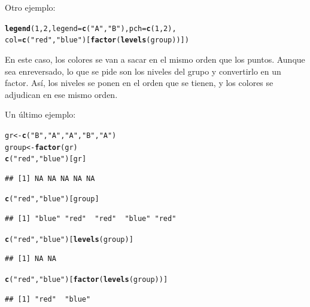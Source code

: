 \documentclass{config/apuntes}\usepackage[]{graphicx}\usepackage[]{xcolor}
\makeatletter
\newcommand{\hlnum}[1]{\textcolor[rgb]{0.686,0.059,0.569}{#1}}%
\newcommand{\hlsng}[1]{\textcolor[rgb]{0.192,0.494,0.8}{#1}}%
\newcommand{\hldef}[1]{\textcolor[rgb]{0.345,0.345,0.345}{#1}}%
\newcommand{\hlkwb}[1]{\textcolor[rgb]{0.69,0.353,0.396}{#1}}%
\newcommand{\hlkwc}[1]{\textcolor[rgb]{0.333,0.667,0.333}{#1}}%
\newcommand{\hlkwd}[1]{\textcolor[rgb]{0.737,0.353,0.396}{\textbf{#1}}}%
\newenvironment{kframe}{%
 \def\at@end@of@kframe{}%
 \ifinner\ifhmode%
  \def\at@end@of@kframe{\end{minipage}}%
  \begin{minipage}{\columnwidth}%
 \fi\fi%
 \def\FrameCommand##1{\hskip\@totalleftmargin \hskip-\fboxsep
 \colorbox{shadecolor}{##1}\hskip-\fboxsep
     \hskip-\linewidth \hskip-\@totalleftmargin \hskip\columnwidth}%
 \MakeFramed {\advance\hsize-\width
   \@totalleftmargin\z@ \linewidth\hsize
   \@setminipage}}%
 {\par\unskip\endMakeFramed%
 \at@end@of@kframe}
\newenvironment{knitrout}{}{} %
\makeatother
\begin{document}
Otro ejemplo:
\begin{knitrout}
\color{fgcolor}\begin{kframe}
\begin{alltt}
\hlkwd{legend}\hldef{(}\hlnum{1}\hldef{,} \hlnum{2}\hldef{,} \hlkwc{legend} \hldef{=} \hlkwd{c}\hldef{(}\hlsng{"A"}\hldef{,} \hlsng{"B"}\hldef{),} \hlkwc{pch} \hldef{=} \hlkwd{c}\hldef{(}\hlnum{1}\hldef{,} \hlnum{2}\hldef{),}
       \hlkwc{col} \hldef{=} \hlkwd{c}\hldef{(}\hlsng{"red"}\hldef{,} \hlsng{"blue"}\hldef{)[}\hlkwd{factor}\hldef{(}\hlkwd{levels}\hldef{(group))])}
\end{alltt}
\end{kframe}
\end{knitrout}
En este caso, los colores se van a sacar en el mismo orden que los puntos. Aunque sea enreversado, lo que se pide son los niveles del grupo y convertirlo en un factor. Así, los niveles se ponen en el orden que se tienen, y los colores se adjudican en ese mismo orden.

Un último ejemplo:
\begin{knitrout}
\color{fgcolor}\begin{kframe}
\begin{alltt}
\hldef{gr} \hlkwb{<-} \hlkwd{c}\hldef{(}\hlsng{"B"}\hldef{,} \hlsng{"A"}\hldef{,} \hlsng{"A"}\hldef{,} \hlsng{"B"}\hldef{,} \hlsng{"A"}\hldef{)}
\hldef{group} \hlkwb{<-} \hlkwd{factor}\hldef{(gr)}
\hlkwd{c}\hldef{(}\hlsng{"red"}\hldef{,} \hlsng{"blue"}\hldef{)[gr]}
\end{alltt}
\begin{verbatim}
## [1] NA NA NA NA NA
\end{verbatim}
\begin{alltt}
\hlkwd{c}\hldef{(}\hlsng{"red"}\hldef{,} \hlsng{"blue"}\hldef{)[group]}
\end{alltt}
\begin{verbatim}
## [1] "blue" "red"  "red"  "blue" "red"
\end{verbatim}
\begin{alltt}
\hlkwd{c}\hldef{(}\hlsng{"red"}\hldef{,} \hlsng{"blue"}\hldef{)[}\hlkwd{levels}\hldef{(group)]}
\end{alltt}
\begin{verbatim}
## [1] NA NA
\end{verbatim}
\begin{alltt}
\hlkwd{c}\hldef{(}\hlsng{"red"}\hldef{,} \hlsng{"blue"}\hldef{)[}\hlkwd{factor}\hldef{(}\hlkwd{levels}\hldef{(group))]}
\end{alltt}
\begin{verbatim}
## [1] "red"  "blue"
\end{verbatim}
\end{kframe}
\end{knitrout}
\end{document}
